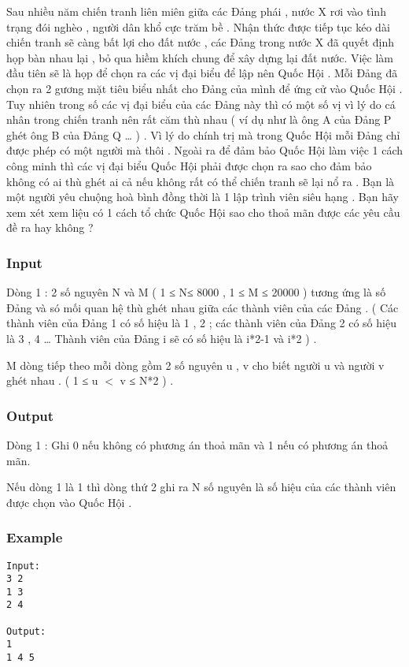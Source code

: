 



   Sau nhiều năm chiến tranh liên miên giữa các Đảng phái , nước X rơi vào tình trạng đói nghèo , người dân khổ cực trăm bề . Nhận thức được tiếp tục kéo dài chiến tranh sẽ càng bất lợi cho đất nước , các Đảng trong nước X đã quyết định họp bàn nhau lại , bỏ qua hiềm khích chung để xây dựng lại đất nước. Việc làm đầu tiên sẽ là họp để chọn ra các vị đại biểu để lập nên Quốc Hội . Mỗi Đảng đã chọn ra 2 gương mặt tiêu biểu nhất cho Đảng của mình để ứng cử vào Quốc Hội . Tuy nhiên trong số các vị đại biểu của các Đảng này thì có một số vị vì lý do cá nhân trong chiến tranh nên rất căm thù nhau ( ví dụ như là ông A của Đảng P ghét ông B của Đảng Q … ) . Vì lý do chính trị mà trong Quốc Hội mỗi Đảng chỉ được phép có một người mà thôi . Ngoài ra để đảm bảo Quốc Hội làm việc 1 cách công minh thì các vị đại biểu Quốc Hội phải được chọn ra sao cho đảm bảo không có ai thù ghét ai cả nếu không rất có thể chiến tranh sẽ lại nổ ra . Bạn là một người yêu chuộng hoà bình đồng thời là 1 lập trình viên siêu hạng . Bạn hãy xem xét xem liệu có 1 cách tổ chức Quốc Hội sao cho thoả mãn được các yêu cầu đề ra hay không ?  

\subsubsection{   Input  }

   Dòng 1 : 2 số nguyên N và M ( 1 ≤ N≤ 8000 , 1 ≤ M ≤ 20000 ) tương ứng là số Đảng và só mối quan hệ thù ghét nhau giữa các thành viên của các Đảng . ( Các thành viên của Đảng 1 có số hiệu là 1 , 2 ; các thành viên của Đảng 2 có số hiệu là 3 , 4 … Thành viên của Đảng i sẽ có số hiệu là i*2-1 và i*2 ) .   


   M dòng tiếp theo mỗi dòng gồm 2 số nguyên u , v cho biết người u và người v ghét nhau . ( 1 ≤ u $<$ v ≤ N*2 ) .  

\subsubsection{   Output  }

   Dòng 1 : Ghi 0 nếu không có phương án thoả mãn và 1 nếu có phương án thoả mãn.   


   Nếu dòng 1 là 1 thì dòng thứ 2 ghi ra N số nguyên là số hiệu của các thành viên được chọn vào Quốc Hội .  

\subsubsection{   Example  }
\begin{verbatim}
Input:
3 2
1 3
2 4

Output:
1
1 4 5

\end{verbatim}
